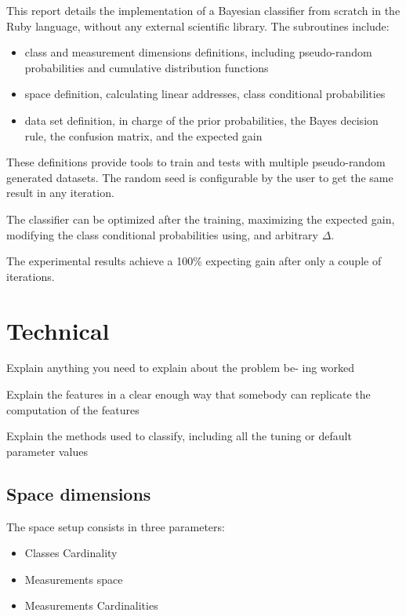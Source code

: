 \documentclass[letterpaper, conference]{IEEEtran}
\begin{document}
This report details the implementation of a Bayesian classifier from scratch in the Ruby language, without any external scientific library. The subroutines include:
\begin{itemize}
  \item class and measurement dimensions definitions, including pseudo-random probabilities and cumulative distribution functions
  \item space definition, calculating linear addresses, class conditional probabilities
  \item data set definition, in charge of the prior probabilities, the Bayes decision rule, the confusion matrix, and the expected gain
\end{itemize}

These definitions provide tools to train and tests with multiple pseudo-random generated datasets. The random seed is configurable by the user to get the same result in any iteration.

The classifier can be optimized after the training, maximizing the expected gain, modifying the class conditional probabilities using, and arbitrary $\Delta$.

The experimental results achieve a 100\% expecting gain after only a couple of iterations.


\section{Technical}


Explain anything you need to explain about the problem be-
ing worked

Explain the features in a clear enough way that somebody can replicate the computation of the features

Explain the methods used to classify, including all the tuning or default parameter values

\subsection{Space dimensions}

The space setup consists in three parameters:

\begin{itemize}
\item Classes Cardinality
\item Measurements space
\item Measurements Cardinalities
\end{itemize}
\end{document}
